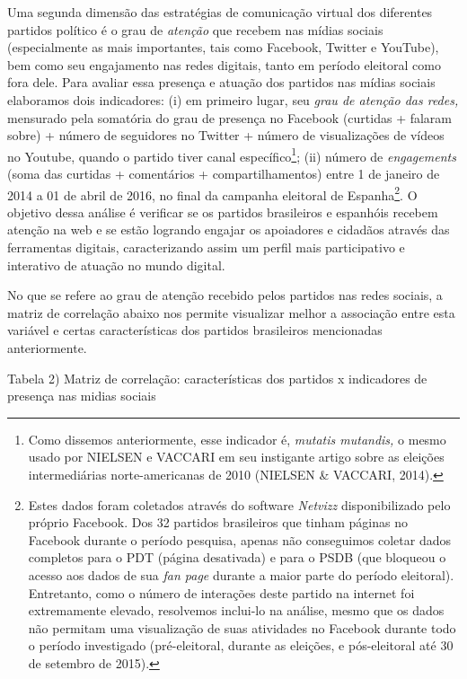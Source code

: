 Uma segunda dimensão das estratégias de comunicação virtual dos
diferentes partidos político é o grau de \emph{atenção} que recebem nas
mídias sociais (especialmente as mais importantes, tais como Facebook,
Twitter e YouTube), bem como seu engajamento nas redes digitais, tanto
em período eleitoral como fora dele. Para avaliar essa presença e
atuação dos partidos nas mídias sociais elaboramos dois indicadores: (i)
em primeiro lugar, seu \emph{grau de atenção das redes,} mensurado pela
somatória do grau de presença no Facebook (curtidas + falaram sobre) +
número de seguidores no Twitter + número de visualizações de vídeos no
Youtube, quando o partido tiver canal específico\footnote{Como dissemos
  anteriormente, esse indicador é, \emph{mutatis mutandis,} o mesmo
  usado por NIELSEN e VACCARI em seu instigante artigo sobre as eleições
  intermediárias norte-americanas de 2010 (NIELSEN \& VACCARI, 2014).};
(ii) número de \emph{engagements} (soma das curtidas + comentários +
compartilhamentos) entre 1 de janeiro de 2014 a 01 de abril de 2016, no
final da campanha eleitoral de Espanha\footnote{Estes dados foram
  coletados através do software \emph{Netvizz} disponibilizado pelo
  próprio Facebook. Dos 32 partidos brasileiros que tinham páginas no
  Facebook durante o período pesquisa, apenas não conseguimos coletar
  dados completos para o PDT (página desativada) e para o PSDB (que
  bloqueou o acesso aos dados de sua \emph{fan page} durante a maior
  parte do período eleitoral). Entretanto, como o número de interações
  deste partido na internet foi extremamente elevado, resolvemos
  inclui-lo na análise, mesmo que os dados não permitam uma visualização
  de suas atividades no Facebook durante todo o período investigado
  (pré-eleitoral, durante as eleições, e pós-eleitoral até 30 de
  setembro de 2015).}. O objetivo dessa análise é verificar se os
partidos brasileiros e espanhóis recebem atenção na web e se estão
logrando engajar os apoiadores e cidadãos através das ferramentas
digitais, caracterizando assim um perfil mais participativo e interativo
de atuação no mundo digital.

No que se refere ao grau de atenção recebido pelos partidos nas redes
sociais, a matriz de correlação abaixo nos permite visualizar melhor a
associação entre esta variável e certas características dos partidos
brasileiros mencionadas anteriormente.

Tabela 2) Matriz de correlação: características dos partidos x
indicadores de presença nas midias sociais

